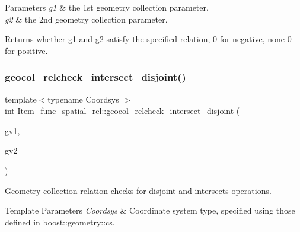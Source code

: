 \begin{DoxyParams}{Parameters}
{\em g1} & the 1st geometry collection parameter. \\
\hline
{\em g2} & the 2nd geometry collection parameter. \\
\hline
\end{DoxyParams}
\begin{DoxyReturn}{Returns}
whether g1 and g2 satisfy the specified relation, 0 for negative, none 0 for positive. 
\end{DoxyReturn}
\mbox{\label{classItem__func__spatial__rel_abbfe9706f8754b71d6549026b5779f14}} 
\subsubsection{\texorpdfstring{geocol\+\_\+relcheck\+\_\+intersect\+\_\+disjoint()}{geocol\_relcheck\_intersect\_disjoint()}}
{\footnotesize\ttfamily template$<$typename Coordsys $>$ \\
int Item\+\_\+func\+\_\+spatial\+\_\+rel\+::geocol\+\_\+relcheck\+\_\+intersect\+\_\+disjoint (\begin{DoxyParamCaption}\item[{const typename B\+G\+\_\+geometry\+\_\+collection\+::\+Geometry\+\_\+list $\ast$}]{gv1,  }\item[{const typename B\+G\+\_\+geometry\+\_\+collection\+::\+Geometry\+\_\+list $\ast$}]{gv2 }\end{DoxyParamCaption})\hspace{0.3cm}{\ttfamily [protected]}}

\mbox{\hyperlink{classGeometry}{Geometry}} collection relation checks for disjoint and intersects operations.


\begin{DoxyTemplParams}{Template Parameters}
{\em Coordsys} & Coordinate system type, specified using those defined in boost\+::geometry\+::cs. \\
\hline
\end{DoxyTemplParams}

